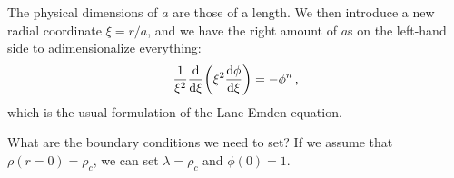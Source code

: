 \documentclass[main.tex]{subfiles}
\begin{document}
The physical dimensions of \(a\) are those of a length. 
We then introduce a new radial coordinate \(\xi = r /a\), and we have the right amount of \(a\)s on the left-hand side to adimensionalize everything: 
%
\begin{align}
\frac{1}{\xi^2} \dv{}{\xi } \qty(\xi^2 \dv{\phi }{\xi }) = - \phi^{n}
\,,
\end{align}
%
which is the usual formulation of the Lane-Emden equation. 

What are the boundary conditions we need to set? If we assume that \(\rho (r=0) = \rho _c\), we can set \(\lambda = \rho _c\) and \(\phi (0) = 1\).
\end{document}
